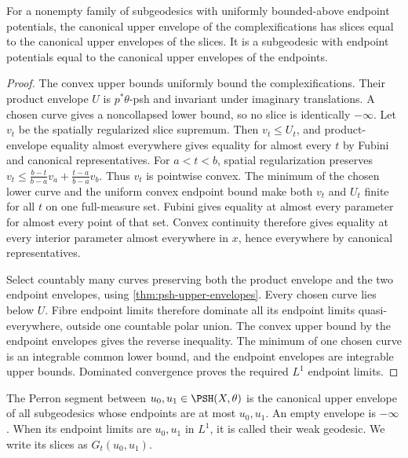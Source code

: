 \begin{lemma}\label{lem:subgeodesic-family-upper-envelope}
For a nonempty family of subgeodesics with uniformly bounded-above endpoint potentials, the canonical upper envelope of the complexifications has slices equal to the canonical upper envelopes of the slices. It is a subgeodesic with endpoint potentials equal to the canonical upper envelopes of the endpoints.
\end{lemma}
\begin{proof}
The convex upper bounds uniformly bound the complexifications. Their product envelope $U$ is $p^*\theta$-psh and invariant under imaginary translations. A chosen curve gives a noncollapsed lower bound, so no slice is identically $-\infty$. Let $v_t$ be the spatially regularized slice supremum. Then $v_t\leq U_t$, and product-envelope equality almost everywhere gives equality for almost every $t$ by Fubini and canonical representatives. For $a<t<b$, spatial regularization preserves
$v_t\leq\frac{b-t}{b-a}v_a+\frac{t-a}{b-a}v_b$.
Thus $v_t$ is pointwise convex. The minimum of the chosen lower curve and the uniform convex endpoint bound make both $v_t$ and $U_t$ finite for all $t$ on one full-measure set. Fubini gives equality at almost every parameter for almost every point of that set. Convex continuity therefore gives equality at every interior parameter almost everywhere in $x$, hence everywhere by canonical representatives.

Select countably many curves preserving both the product envelope and the two endpoint envelopes, using \cref{thm:psh-upper-envelopes}. Every chosen curve lies below $U$. Fibre endpoint limits therefore dominate all its endpoint limits quasi-everywhere, outside one countable polar union. The convex upper bound by the endpoint envelopes gives the reverse inequality. The minimum of one chosen curve is an integrable common lower bound, and the endpoint envelopes are integrable upper bounds. Dominated convergence proves the required $L^1$ endpoint limits.
\end{proof}

\begin{definition}\label{def:relative-perron-geodesic}
The Perron segment between $u_0,u_1\in\PSH(X,\theta)$ is the canonical upper envelope of all subgeodesics whose endpoints are at most $u_0,u_1$. An empty envelope is $-\infty$. When its endpoint limits are $u_0,u_1$ in $L^1$, it is called their weak geodesic. We write its slices as $G_t(u_0,u_1)$.
\end{definition}

